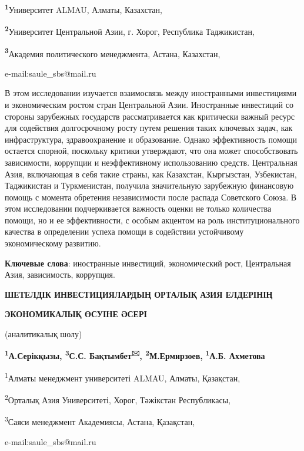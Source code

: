 {\bfseries \textsuperscript{1}}Университет ALMAU, Алматы, Казахстан,

{\bfseries \textsuperscript{2}}Университет Центральной Азии, г. Хорог,
Республика Таджикистан,

{\bfseries \textsuperscript{3}}Академия политического менеджмента, Астана,
Казахстан,

e-mail:saule\_sbs@mail.ru

В этом исследовании изучается взаимосвязь между иностранными
инвестициями и экономическим ростом стран Центральной Азии. Иностранные
инвестиций со стороны зарубежных государств рассматривается как
критически важный ресурс для содействия долгосрочному росту путем
решения таких ключевых задач, как инфраструктура, здравоохранение и
образование. Однако эффективность помощи остается спорной, поскольку
критики утверждают, что она может способствовать зависимости, коррупции
и неэффективному использованию средств. Центральная Азия, включающая в
себя такие страны, как Казахстан, Кыргызстан, Узбекистан, Таджикистан и
Туркменистан, получила значительную зарубежную финансовую помощь с
момента обретения независимости после распада Советского Союза. В этом
исследовании подчеркивается важность оценки не только количества помощи,
но и ее эффективности, с особым акцентом на роль институционального
качества в определении успеха помощи в содействии устойчивому
экономическому развитию.

{\bfseries Ключевые слова}: иностранные инвестиций, экономический рост,
Центральная Азия, зависимость, коррупция.

{\bfseries ШЕТЕЛДІК ИНВЕСТИЦИЯЛАРДЫҢ ОРТАЛЫҚ АЗИЯ ЕЛДЕРІНІҢ}

{\bfseries ЭКОНОМИКАЛЫҚ ӨСУІНЕ ӘСЕРІ}

(аналитикалық шолу)

{\bfseries \textsuperscript{1}А.Серікқызы, \textsuperscript{3}С.С.
Бақтымбет\textsuperscript{🖂}, \textsuperscript{2}М.Ермирзоев,}
{\bfseries \textsuperscript{1}А.Б. Ахметова}

\textsuperscript{1}Алматы менеджмент университеті ALMAU, Алматы,
Қазақстан,

\textsuperscript{2}Орталық Азия Университеті, Хорог, Тәжікстан
Республикасы,

\textsuperscript{3}Саяси менеджмент Академиясы, Астана, Қазақстан,

e-mail:saule\_sbs@mail.ru

